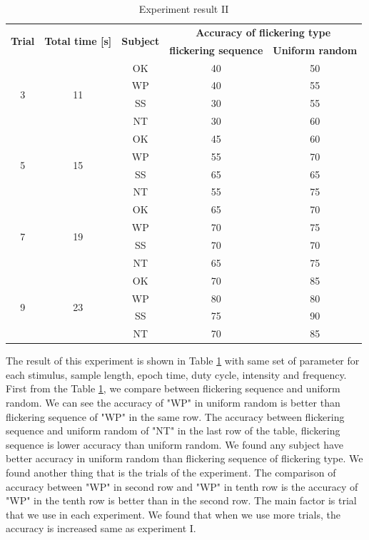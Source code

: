 \begin{table}[ht]
\centering
\begin{tabular}{| c | c | c | c | c |}

			\hline 
			\multirow{2}{*}{\textbf{Trial}} & 
  			\multirow{2}{*}{\textbf{Total time [s]}}  & 
            \multirow{2}{*}{\textbf{Subject}} &
            \multicolumn{2}{c|}{\textbf{Accuracy of flickering type}} \\
            \cline{4-5}
            &&&\multicolumn{1}{c|}{\textbf{flickering sequence}} &\multicolumn{1}{c|}{\textbf{Uniform random}}  \\
			\hline 
			\multirow{4}{*}{3}&\multirow{4}{*}{11}&OK&40&50 \\
			\cline{3-5}
			&&WP&40&55 \\ \cline{3-5}
			&&SS&30&55 \\ \cline{3-5}
			&&NT&30&60 \\
            \hline
			\multirow{4}{*}{5}&\multirow{4}{*}{15}&OK&45&60 \\
			\cline{3-5}
			&&WP&55&70 \\ \cline{3-5}
			&&SS&65&65 \\ \cline{3-5}
			&&NT&55&75 \\
            \hline
            \multirow{4}{*}{7}&\multirow{4}{*}{19}&OK&65&70 \\
			\cline{3-5}
			&&WP&70&75 \\ \cline{3-5}
			&&SS&70&70 \\ \cline{3-5}
			&&NT&65&75 \\
            \hline 
            \multirow{4}{*}{9}&\multirow{4}{*}{23}&OK&70&85 \\
			\cline{3-5}
			&&WP&80&80 \\ \cline{3-5}
			&&SS&75&90 \\ \cline{3-5}
			&&NT&70&85 \\
            \hline 
		\end{tabular}       
\caption{Experiment result II}
\label{table:result2}
\end{table}

The result of this experiment is shown in Table \ref{table:result2} with same set of parameter for each stimulus, sample length, epoch time, duty cycle, intensity and frequency. First from the Table \ref{table:result2}, we compare between flickering sequence and uniform random. We can see the accuracy of "WP" in uniform random is better than flickering sequence of "WP" in the same row. The accuracy between flickering sequence and uniform random of "NT" in the last row of the table, flickering sequence is lower accuracy than uniform random. We found any subject have better accuracy in uniform random than flickering sequence of flickering type. We found another thing that is the trials of the experiment. The comparison of accuracy between "WP" in second row and "WP" in tenth row is the accuracy of "WP" in the tenth row is better than in the second row. The main factor is trial that we use in each experiment. We found that when we use more trials, the accuracy is increased same as experiment I.


